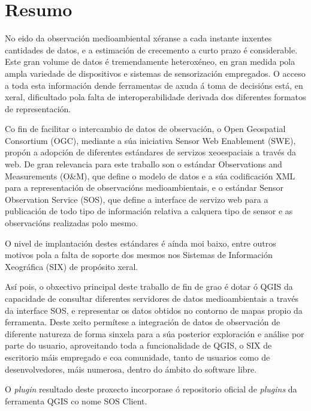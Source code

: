 \pagestyle{plain}
\chapter*{Resumo}
No eido da observación medioambiental xéranse a cada instante inxentes cantidades de datos, e a estimación de crecemento a curto prazo é considerable. Este gran volume de datos é tremendamente heteroxéneo, en gran medida pola ampla variedade de dispositivos e sistemas de sensorización empregados. O acceso a toda esta información dende ferramentas de axuda á toma de decisións está, en xeral, dificultado pola falta de interoperabilidade derivada dos diferentes formatos de representación.

Co fin de facilitar o intercambio de datos de observación, o Open Geospatial Consortium (OGC), mediante a súa iniciativa Sensor Web Enablement (SWE), propón a adopción de diferentes estándares de servizos xeoespaciais a través da web. De gran relevancia para este traballo son o estándar Observations and Measurements (O\&M), que define o modelo de datos e a súa codificación XML para a representación de observacións medioambientais, e o estándar Sensor Observation Service (SOS), que define a interface de servizo web para a publicación de todo tipo de información relativa a calquera tipo de sensor e as observacións realizadas polo mesmo.

O nivel de implantación destes estándares é aínda moi baixo, entre outros motivos pola a falta de soporte dos mesmos nos Sistemas de Información Xeográfica (SIX) de propósito xeral.

Así pois, o obxectivo principal deste traballo de fin de grao é dotar ó QGIS da capacidade de consultar diferentes servidores de datos medioambientais a través da interface SOS, e representar os datos obtidos no contorno de mapas propio da ferramenta. Deste xeito permítese a integración de datos de observación de diferente natureza de forma sinxela para a súa posterior exploración e análise por parte do usuario, aproveitando toda a funcionalidade de QGIS, o SIX de escritorio máis empregado e coa comunidade, tanto de usuarios como de desenvolvedores, máis numerosa, dentro do ámbito do software libre.

O \emph{plugin} resultado deste proxecto incorporase ó repositorio oficial de \emph{plugins} da ferramenta QGIS co nome SOS Client.